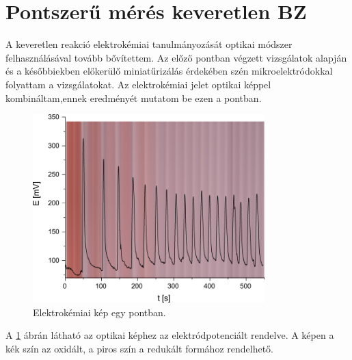\section{Pontszerű mérés keveretlen BZ}
A keveretlen reakció elektrokémiai tanulmányozását optikai módszer felhasználásával tovább bővítettem. Az előző pontban végzett vizsgálatok alapján és a későbbiekben előkerülő miniatűrizálás érdekében szén mikroelektródokkal folyattam a vizsgálatokat. Az elektrokémiai jelet optikai képpel kombináltam,ennek eredményét  mutatom be ezen a pontban.
\begin{figure}[h]
\centering
\includegraphics[width=0.8\textwidth]{img/pontszerumeres.png}
\caption{Elektrokémiai kép egy pontban.}
\label{fig:pontszerumeres}
\end{figure}

A \ref{fig:pontszerumeres} ábrán látható az optikai képhez az elektródpotenciált rendelve. A képen a kék szín az oxidált, a piros szín a redukált formához rendelhető.

